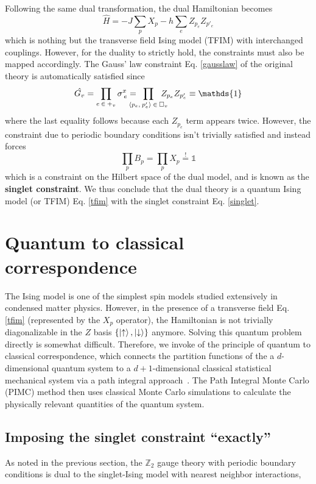 \documentclass[../thesis_main.tex]{subfiles}
\begin{document}
Following the same dual transformation, the dual Hamiltonian becomes
\begin{equation}
    \hat{H} = -J \sum_p X_p - h \sum_e Z_{p_e} Z_{p'_e}
    \label{tfim}
\end{equation}
which is nothing but the transverse field Ising model (TFIM) with interchanged couplings. However, for the duality to strictly hold, the constraints must also be mapped accordingly. The Gauss' law constraint Eq. \eqref{gausslaw} of the original theory is automatically satisfied since 
\begin{equation}
    \hat{G_v} = \prod_{e \:\in\: +_v} \sigma^x_{\: e} = \!\!\!\!\!\!\! \prod_{\expval{p_e, \: p'_e} \: \in \: \Box_v} \!\!\!\!\!\!  Z_{p_e} Z_{p'_e} \equiv \mathds{1}
\end{equation}
where the last equality follows because each $Z_{p_e}$ term appears twice. However, the constraint due to periodic boundary conditions isn't trivially satisfied and instead forces
\begin{equation}
    \prod_p B_p = \prod_p X_p \stackrel{!}{=} \mathds{1}
    \label{singlet}
\end{equation}
which is a constraint on the Hilbert space of the dual model, and is known as the \textbf{singlet constraint}. We thus conclude that the dual theory is a quantum Ising model (or TFIM) Eq. \eqref{tfim} with the singlet constraint Eq. \eqref{singlet}.
\section{Quantum to classical correspondence}
The Ising model is one of the simplest spin models studied extensively in condensed matter physics. However, in the presence of a transverse field Eq. \eqref{tfim} (represented by the $X_p$ operator), the Hamiltonian is not trivially diagonalizable in the $Z$ basis $\{\ket{\uparrow}, \ket{\downarrow} \}$ anymore. Solving this quantum problem directly is somewhat difficult. Therefore, we invoke of the principle of quantum to classical correspondence, which connects the partition functions of the a $d$-dimensional quantum system to a $d+1$-dimensional classical statistical mechanical system via a path integral approach~\cite{suzuki}. The Path Integral Monte Carlo (PIMC) method then uses classical Monte Carlo simulations to calculate the physically relevant quantities of the quantum system.
\subsection{Imposing the singlet constraint ``exactly''}
As noted in the previous section, the $\mathbb{Z}_2$ gauge theory with periodic boundary conditions is dual to the singlet-Ising model with nearest neighbor interactions,
\end{document}
